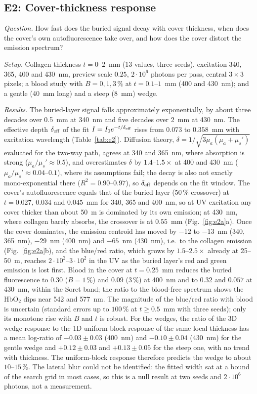 \documentclass[journal]{IEEEtran}
\newcommand{\mua}{\mu_a}
\newcommand{\musp}{\mu_s'}
\begin{document}
\subsection{E2: Cover-thickness response}
\emph{Question.} How fast does the buried signal decay with cover thickness, when does the cover's own autofluorescence take over, and how does the cover distort the emission spectrum?

\emph{Setup.} Collagen thickness $t=0$--$2$~mm (13 values, three seeds), excitation 340, 365, 400 and 430~nm, preview scale $0.25$, $2\cdot10^6$ photons per pass, central $3\times3$ pixels; a blood study with $B=0,1,3\,\%$ at $t=0.1$--$1$~mm (400 and 430~nm); and a gentle (40~mm long) and a steep (8~mm) wedge.

\emph{Results.} The buried-layer signal falls approximately exponentially, by about three decades over 0.5~mm at 340~nm and five decades over 2~mm at 430~nm. The effective depth $\delta_{\rm eff}$ of the fit $I=I_0e^{-t/\delta_{\rm eff}}$ rises from $0.073$ to $0.358$~mm with excitation wavelength (Table~\ref{tab:e2}). Diffusion theory, $\delta=1/\sqrt{3\mua(\mua+\musp)}$ evaluated for the two-way path, agrees at 340 and 365~nm, where absorption is strong ($\mua/\musp\approx0.5$), and overestimates $\delta$ by $1.4$--$1.5\times$ at 400 and 430~nm ($\mua/\musp\approx0.04$--$0.1$), where its assumptions fail; the decay is also not exactly mono-exponential there ($R^2=0.90$--$0.97$), so $\delta_{\rm eff}$ depends on the fit window. The cover's autofluorescence equals that of the buried layer ($50\,\%$ crossover) at $t=0.027$, $0.034$ and $0.045$~mm for 340, 365 and 400~nm, so at UV excitation any cover thicker than about 50~\textmu m is dominated by its own emission; at 430~nm, where collagen barely absorbs, the crossover is at $0.55$~mm (Fig.~\ref{fig:e2a}a). Once the cover dominates, the emission centroid has moved by $-12$ to $-13$~nm (340, 365~nm), $-29$~nm (400~nm) and $-65$~nm (430~nm), i.e.\ to the collagen emission (Fig.~\ref{fig:e2a}b), and the blue/red ratio, which grows by $1.5$--$2.5\times$ already at 25--50~\textmu m, reaches $2\cdot10^2$--$3\cdot10^2$ in the UV as the buried layer's red and green emission is lost first. Blood in the cover at $t=0.25$~mm reduces the buried fluorescence to $0.30$ ($B=1\,\%$) and $0.09$ ($3\,\%$) at 400~nm and to $0.32$ and $0.057$ at 430~nm, within the Soret band; the ratio to the blood-free spectrum shows the HbO$_2$ dips near 542 and 577~nm. The magnitude of the blue/red ratio with blood is uncertain (standard errors up to $100\,\%$ at $t\ge0.5$~mm with three seeds); only its monotone rise with $B$ and $t$ is robust. For the wedges, the ratio of the 3D wedge response to the 1D uniform-block response of the same local thickness has a mean log-ratio of $-0.03\pm0.03$ (400~nm) and $-0.10\pm0.04$ (430~nm) for the gentle wedge and $+0.12\pm0.03$ and $+0.13\pm0.05$ for the steep one, with no trend with thickness. The uniform-block response therefore predicts the wedge to about $10$--$15\,\%$. The lateral blur could not be identified: the fitted width sat at a bound of the search grid in most cases, so this is a null result at two seeds and $2\cdot10^6$ photons, not a measurement.
\end{document}
